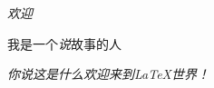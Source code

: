 \documentclass{ctexart}
\begin{document}

\emph{欢迎}%

我是一个\emph*{说}故事的人

\emph{你说这是什么\emph{欢迎}来到\LaTeX 世界！}
\end{document}
